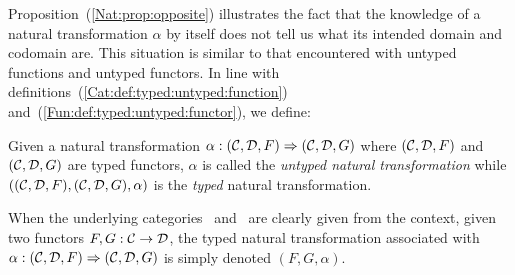 Proposition~(\ref{Nat:prop:opposite}) illustrates the fact that the knowledge
of a natural transformation $\alpha$ by itself does not tell us what its 
intended domain and codomain are. This situation is similar to that encountered
with untyped functions and untyped functors. In line with
definitions~(\ref{Cat:def:typed:untyped:function}) and~(\ref{Fun:def:typed:untyped:functor}), we define:
\begin{defin}\label{Nat:def:typed:untyped:natural}
    Given a natural transformation $\alpha:(\mbox{$\cal C$},\mbox{$\cal D$},F)\Rightarrow(\mbox{$\cal C$},\mbox{$\cal D$},G)$
    where $(\mbox{$\cal C$},\mbox{$\cal D$},F)$ and $(\mbox{$\cal C$},\mbox{$\cal D$},G)$ are typed functors, $\alpha$ is 
    called the {\em untyped natural transformation} while
    $((\mbox{$\cal C$},\mbox{$\cal D$},F),(\mbox{$\cal C$},\mbox{$\cal D$},G),\alpha)$ is the {\em typed} 
    natural transformation.
\end{defin}

\begin{notation}\label{Nat:notation:typed:natural}
    When the underlying categories \Cat\ and \Dat\ are clearly given from the
    context, given two functors $F,G:\mbox{$\cal C$}\to\mbox{$\cal D$}$, the typed natural
    transformation associated with $\alpha:(\mbox{$\cal C$},\mbox{$\cal D$},F)\Rightarrow (\mbox{$\cal C$},\mbox{$\cal D$},G)$
    is simply denoted $(F,G,\alpha)$.
\end{notation}

